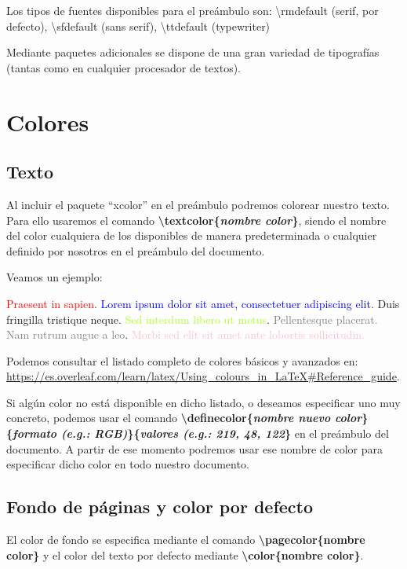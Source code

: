 \documentclass[12pt]{book} %
\begin{document}
Los tipos de fuentes disponibles para el preámbulo son: \textbackslash rmdefault (serif, por defecto), \textbackslash sfdefault (sans serif), \textbackslash ttdefault (typewriter)

Mediante paquetes adicionales se dispone de una gran variedad de tipografías (tantas como en cualquier procesador de textos).

\section{Colores}

\subsection{Texto}

Al incluir el paquete ``xcolor'' en el preámbulo podremos colorear  nuestro texto. Para ello usaremos el comando \textbf{\textbackslash textcolor\{\emph{nombre color}\}}, siendo el nombre del color cualquiera de los disponibles de manera predeterminada o cualquier definido por nosotros en el preámbulo del documento.

Veamos un ejemplo:

\textcolor{red}{Praesent in sapien}.
\textcolor{blue}{Lorem ipsum dolor sit amet, consectetuer 
adipiscing elit}.
\textcolor{TealBlue}{Duis fringilla tristique neque}.
\textcolor{GreenYellow}{Sed interdum libero ut metus}.
\textcolor{gray}{Pellentesque placerat. Nam rutrum augue a leo}. 
\textcolor{pink}{Morbi sed elit sit amet ante lobortis sollicitudin.}

Podemos consultar el listado completo de colores básicos y avanzados en: \url{https://es.overleaf.com/learn/latex/Using_colours_in_LaTeX#Reference_guide}.

Si algún color no está disponible en dicho listado, o deseamos especificar uno muy concreto, podemos usar el comando \textbf{\textbackslash definecolor\{\emph{nombre nuevo color}\}\{\emph{formato (e.g.: RGB)}\}\{\emph{valores (e.g.: 219, 48, 122}\}} en el preámbulo del documento. A partir de ese momento podremos usar ese nombre de color para especificar dicho color en todo nuestro documento.

\subsection{Fondo de páginas y color por defecto}

El color de fondo se especifica mediante el comando \textbf{\textbackslash pagecolor\{nombre color\}} y el color del texto por defecto mediante  \textbf{\textbackslash color\{nombre color\}}.
\end{document}
